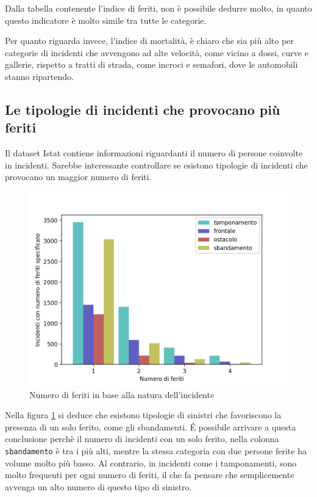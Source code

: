 \documentclass[a4paper]{report}
\newcommand{\columnstyle}[1]{\texttt{#1}}
\begin{document}
Dalla tabella contenente l'indice di feriti, non è possibile dedurre molto, in quanto 
questo indicatore è molto simile tra tutte le categorie.

Per quanto riguarda invece, l'indice di mortalità, è chiaro che sia più alto 
per categorie di incidenti che avvengono ad alte velocità, come vicino a dossi, curve e 
gallerie, rispetto a tratti di strada, come incroci e semafori, dove le 
automobili stanno ripartendo.

\subsection{Le tipologie di incidenti che provocano più feriti}

Il dataset Istat contiene informazioni riguardanti il numero di persone coinvolte in incidenti.
Sarebbe interessante controllare se esistono tipologie di incidenti che provocano 
un maggior numero di feriti.

\begin{figure}
    \includegraphics[width=\linewidth]{../src/incidenti/incidenti_senza_coords/natura_incidente/natura_incidente.png}
    \caption{Numero di feriti in base alla natura dell'incidente}
    \label{fig:numero-feriti}
\end{figure}

Nella figura \ref{fig:numero-feriti} si deduce che esistono tipologie di sinistri che 
favoriscono la presenza di un solo ferito, come gli sbandamenti. 
\'E possibile arrivare a questa conclusione perchè il numero di incidenti con un solo ferito, 
nella colonna \columnstyle{sbandamento} è tra i più alti, mentre la stessa categoria 
con due persone ferite ha volume molto più basso.
Al contrario, in incidenti come i tamponamenti, sono molto frequenti per ogni 
numero di feriti, il che fa pensare che semplicemente avvenga un alto numero di 
questo tipo di sinistro.
\end{document}
